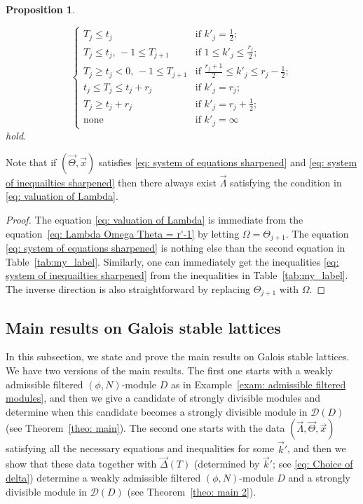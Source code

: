 \documentclass[11pt]{amsart}
\theoremstyle{definition}
\numberwithin{equation}{subsection}
\theoremstyle{plain}
\theoremstyle{plain}
\theoremstyle{plain}
\theoremstyle{plain}
\theoremstyle{plain}
\theoremstyle{plain}
\theoremstyle{plain}
\theoremstyle{plain}
\newtheorem{prop}[equation]{Proposition}
\theoremstyle{plain}
\theoremstyle{plain}
\theoremstyle{plain}
\theoremstyle{plain}
\theoremstyle{definition}
\theoremstyle{definition}
\theoremstyle{definition}
\theoremstyle{remark}
\renewcommand{\(}{\textup{(}}
\renewcommand{\)}{\textup{)}}
\newcommand{\cD}{\mathcal{D}}
\newcommand{\vx}{\vec{x}}
\newcommand{\vk}{\vec{k}}
\newcommand{\vDel}{\vec{\Delta}}
\newcommand{\vLam}{\vec{\Lambda}}
\newcommand{\vTh}{\vec{\Theta}}
\begin{document}
\begin{prop}
\begin{enumerate}[leftmargin=*]
\begin{equation}
            \begin{cases}
                T_j\leq t_j  & \mbox{if }k'_j=\frac{1}{2};\\
                T_j\leq t_j,\, -1\leq T_{j+1} & \mbox{if } 1\leq k'_j\leq \frac{r_j}{2};\\
                T_j\geq t_j<0,\, -1\leq T_{j+1} &\mbox{if } \frac{r_j+1}{2}\leq k'_j\leq r_j-\frac{1}{2};\\
                t_j\leq T_j\leq t_j+r_j &\mbox{if }k'_j=r_j;\\
                T_j\geq t_j+r_j &\mbox{if }k'_j=r_j+\frac{1}{2};\\
                \mbox{none} &\mbox{if }k'_j=\infty
            \end{cases}
        \end{equation}
    hold.
\end{enumerate}
\end{prop}

Note that if $(\vTh,\vx)$ satisfies \eqref{eq: system of equations sharpened} and \eqref{eq: system of inequailties sharpened} then there always exist $\vLam$ satisfying the condition in \eqref{eq: valuation of Lambda}.
\begin{proof}
The equation \eqref{eq: valuation of Lambda} is immediate from the equation~\eqref{eq: Lambda Omega Theta = r'-1} by letting $\Omega=\Theta_{j+1}$. The equation \eqref{eq: system of equations sharpened} is nothing else than the second equation in Table~\ref{tab:my_label}. Similarly, one can immediately get the inequalities \eqref{eq: system of inequailties sharpened} from the inequalities in Table~\ref{tab:my_label}. The inverse direction is also straightforward by replacing $\Theta_{j+1}$ with $\Omega$.
\end{proof}



\subsection{Main results on Galois stable lattices}\label{subsec: main results}
In this subsection, we state and prove the main results on Galois stable lattices. We have two versions of the main results. The first one starts with a weakly admissible filtered $(\phi,N)$-module $D$ as in Example~\ref{exam: admissible filtered modules}, and then we give a candidate of strongly divisible modules and determine when this candidate becomes a strongly divisible module in $\cD(D)$ (see Theorem~\ref{theo: main}). The second one starts with the data $(\vLam,\vTh,\vx)$ satisfying all the necessary equations and inequalities for some $\vk'$, and then we show that these data together with $\vDel(T)$ (determined by $\vk'$; see \eqref{eq: Choice of delta}) determine a weakly admissible filtered $(\phi,N)$-module $D$ and a strongly divisible module in $\cD(D)$ (see Theorem~\ref{theo: main 2}).
\end{document}
